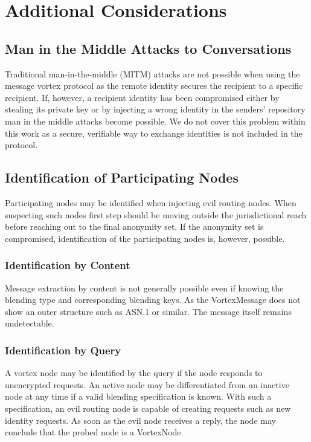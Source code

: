 \section{Additional Considerations}

\subsection{Man in the Middle Attacks to Conversations}
Traditional man-in-the-middle (MITM) attacks are not possible when using the message vortex protocol as the remote identity secures the recipient to a specific recipient. If, however, a recipient identity has been compromised either by stealing its private key or by injecting a wrong identity in the senders' repository man in the middle attacks become possible. We do not cover this problem within this work as a secure, verifiable way to exchange identities is not included in the protocol.

\subsection{Identification of Participating Nodes}
Participating nodes may be identified when injecting evil routing nodes. When suspecting such nodes first step should be moving outside the jurisdictional reach before reaching out to the final anonymity set. If the anonymity set is compromised, identification of the participating nodes is, however, possible.

\subsubsection{Identification by Content}
Message extraction by content is not generally possible even if knowing the blending type and corresponding blending keys. As the VortexMessage does not show an outer structure such as ASN.1 or similar. The message itself remains undetectable.

\subsubsection{Identification by Query}
A vortex node may be identified by the query if the node responds to unencrypted requests. An active node may be differentiated from an inactive node at any time if a valid blending specification is known. With such a specification, an evil routing node is capable of creating requests such as new identity requests. As soon as the evil node receives a reply, the node may conclude that the probed node is a VortexNode.

